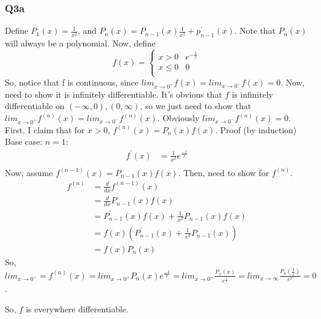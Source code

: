 \documentclass{article}
\begin{document}
\subsubsection*{Q3a}
Define $P_{1}(x) = \frac{1}{x^{2}}$, and $P_{n}(x) = P_{n-1}(x)\frac{1}{x^2} + p^{\prime}_{n-1}(x)$. Note that $P_{n}(x)$ will always be a polynomial. Now, define 
\[f(x) = \begin{cases}
x > 0 & e^{-\frac{1}{x}}\\ 
x \leq 0 &0\\
\end{cases}
\]
So, notice that f is continuous, since $lim_{x\rightarrow 0 ^{+}} f(x) = lim_{x\rightarrow 0 ^{-}} f(x) = 0$. Now, need to show it is infinitely differentiable. It's obvious that $f$ is infinitely differentiable on $(-\infty, 0), (0, \infty)$, so we just need to show that $lim_{x\rightarrow 0 ^{+}} f^{(n)}(x) = lim_{x\rightarrow 0 ^{-}} f^{(n)}(x)$. Obviously $lim_{x\rightarrow 0 ^{-}} f^{(n)}(x) = 0$.  First, I claim that for $x>0$, $f^{(n)}(x) = P_{n}(x)f(x)$. Proof (by induction)\\
Base case: $n=1$:
\begin{align*}
f^{\prime}(x) &= \frac{1}{x^{2}}e^{\frac{-1}{x}}\\
\end{align*}
Now, assume $f^{(n-1)}(x) = P_{n-1}(x)f(x)$. Then, need to show for $f^{(n)}$.
\begin{align*}
f^{(n)} &= \frac{d}{dx} f^{(n-1)}(x)\\
&= \frac{d}{dx} P_{n-1}(x)f(x)\\
&= P_{n-1}^{\prime}(x)f(x) + \frac{1}{x^2}P_{n-1}(x)f(x)\\
&=f(x)( P_{n-1}^{\prime}(x) + \frac{1}{x^2}P_{n-1}(x))\\
&= f(x)P_{n}(x)
\end{align*} 
So, $lim_{x\rightarrow 0^{+}} = f^{(n)}(x) =lim_{x\rightarrow 0^{+}} P_{n}(x) e^{\frac{-1}{x}} =lim_{x\rightarrow 0^{+}} \frac{P_{n}(x)}{e^{\frac{1}{x}}} = lim_{x\rightarrow \infty} \frac{P_{n}(\frac{1}{x})}{e^{x}} = 0$.

So, $f$ is everywhere differentiable.
\end{document}
